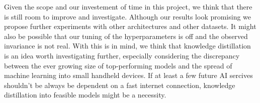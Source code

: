 \documentclass[10pt,twocolumn,letterpaper]{article}
\begin{document}
Given the scope and our investement of time in this project, we think that there is still room to improve and investigate. Although our results look promising we propose further experiments with other architectures and other datasets. It might also be possible that our tuning of the hyperparameters is off and the observed invariance is not real. With this is in mind, we think that knowledge distillation is an idea worth investigating further, especially considering the discrepancy between the ever growing size of top-performing models and the spread of machine learning into small handheld devices. If at least a few future AI sercives shouldn't be always be dependent on a fast internet connection, knowledge distillation into feasible models might be a necessity.

{\small


}
\end{document}
